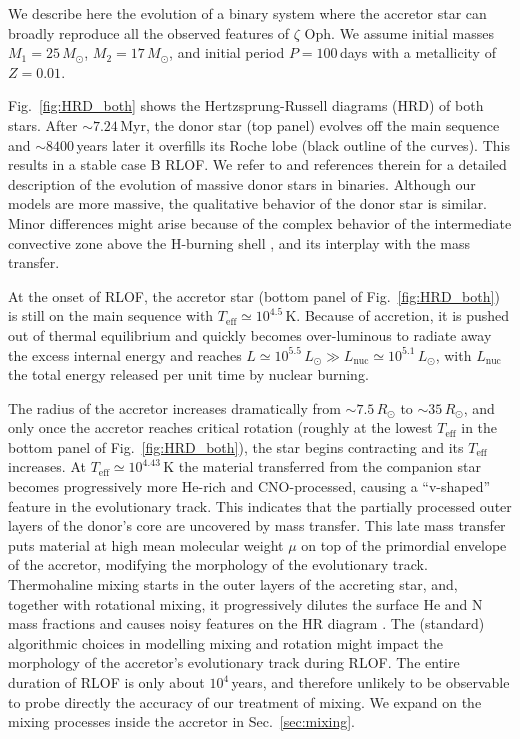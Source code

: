 \documentclass[twocolumn,twocolappendix,trackchanges]{aastex63}
\DeclareRobustCommand{\Figref}[1]{Fig.~\ref{#1}}
\DeclareRobustCommand{\Secref}[1]{Sec.~\ref{#1}}
\newcommand{\zoph}{$\zeta$ Oph}
\begin{document}
We describe here the evolution of a binary system where the accretor
star can broadly reproduce all the observed features of \zoph. We
assume initial masses $M_1=25\,M_\odot$, $M_2=17\,M_\odot$, and initial
period $P=100$\,days with a metallicity of $Z=0.01$.

\Figref{fig:HRD_both} shows the Hertzsprung-Russell diagrams (HRD) of
both stars. After
$\sim$$7.24$\,Myr, the donor star (top panel) evolves off the main sequence and
$\sim8400$\,years later it overfills its Roche lobe (black outline of the curves). This results in a stable case B RLOF. We refer to \cite{gotberg:17, klencki:20, laplace:21, blagorodnova:21} and references therein for a detailed description of the evolution of massive donor stars in binaries. Although our models are more massive, the qualitative behavior of the donor star is similar. Minor differences might arise because of the complex behavior of the intermediate convective zone above the H-burning shell \citep[][]{klencki:21}, and its interplay with the mass transfer.

At the onset of RLOF, the accretor star (bottom panel of \Figref{fig:HRD_both}) is still on the main sequence with
$T_\mathrm{eff}\simeq10^{4.5}$\,K. Because of accretion, it is pushed out of thermal equilibrium and quickly becomes over-luminous to radiate away the excess internal energy and reaches $L\simeq10^{5.5}\,L_\odot\gg
L_\mathrm{nuc}\simeq
10^{5.1}\,L_\odot$, with
$L_\mathrm{nuc}$ the total energy released per unit time by nuclear burning.

The radius of the accretor increases dramatically from
$\sim7.5\,R_\odot$ to $\sim35\,R_\odot$, and only once the accretor
reaches critical rotation (roughly at the lowest $T_\mathrm{eff}$ in
the bottom panel of \Figref{fig:HRD_both}), the star begins
contracting and its $T_\mathrm{eff}$ increases. At
$T_\mathrm{eff}\simeq 10^{4.43}$\,K the material transferred from the
companion star becomes progressively more He-rich and CNO-processed,
causing a ``v-shaped'' feature in the evolutionary track. This
indicates that the partially processed outer layers of the donor's
core are uncovered by mass
transfer. %
This late mass transfer puts material at high mean molecular weight
$\mu$ on top of the primordial envelope of the accretor, modifying the
morphology of the evolutionary track. Thermohaline mixing starts in
the outer layers of the accreting star, and, together with rotational
mixing, it progressively dilutes the surface He and N mass fractions
and causes noisy features on the HR diagram
\citep[e.g.,][]{cantiello:07}. The (standard) algorithmic choices in
modelling mixing and rotation might impact the morphology of the
accretor's evolutionary track during RLOF. The entire duration of RLOF
is only about $10^4$\,years, and therefore unlikely to be observable
to probe directly the accuracy of our treatment of mixing. We expand
on the mixing processes inside the accretor in \Secref{sec:mixing}.
\end{document}
